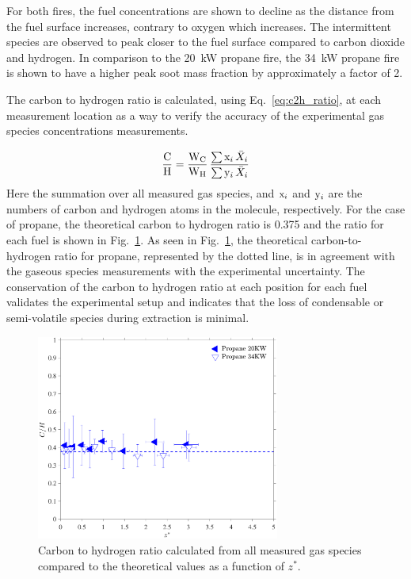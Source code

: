 \documentclass[12pt]{ussci}
\begin{document}
For both fires, the fuel concentrations are shown to decline as the distance from the fuel surface increases, contrary to oxygen which increases. The intermittent species are observed to peak closer to the fuel surface compared to carbon dioxide and hydrogen. In comparison to the 20~kW propane fire, the 34~kW propane fire is shown to have a higher peak soot mass fraction by approximately a factor of 2. 

The carbon to hydrogen ratio is calculated, using Eq.~\ref{eq:c2h_ratio}, at each measurement location as a way to verify the accuracy of the experimental gas species concentrations measurements. 

\begin{equation}\label{eq:c2h_ratio}
  \frac{\rm C}{\rm H}= \frac{\textrm{W}_{\rm{C}}}{\textrm{W}_{\rm{H}}}\, \frac{ \sum  {\rm x}_i \, \bar{X}_{i}}{\sum {\rm y}_i \, \bar{X}_{i}}
\end{equation}
Here the summation over all measured gas species, and ${\rm x}_i$ and ${\rm y}_i$ are the numbers of carbon and hydrogen atoms in the molecule, respectively. For the case of propane, the theoretical carbon to hydrogen ratio is 0.375 and the ratio for each fuel is shown in Fig.~\ref{fig:C2H}. As seen in Fig.~\ref{fig:C2H}, the theoretical carbon-to-hydrogen ratio for propane, represented by the dotted line, is in agreement with the gaseous species measurements with the experimental uncertainty. The conservation of the carbon to hydrogen ratio at each position for each fuel validates the experimental setup and indicates that the loss of condensable or semi-volatile species during extraction is minimal. 
\begin{figure}[h!]
	\centering
\includegraphics[width=8cm, keepaspectratio]{CtoH_Ratio.pdf}
	\caption[Carbon to hydrogen ratio calculated from all species]{Carbon to hydrogen ratio calculated from all measured gas species compared to the theoretical values as a function of $z^*$.}
	\label{fig:C2H}
\end{figure}
\end{document}
